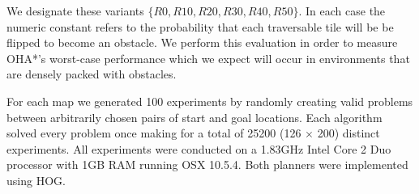 We designate these variants $\lbrace R0, R10, R20, R30, R40, R50 \rbrace$. 
In each case the numeric constant refers to the probability that each traversable tile will be be flipped to 
become an obstacle.
We perform this evaluation in order to measure OHA*'s worst-case performance which we expect will occur in 
environments that are densely packed with obstacles.
\par
For each map we generated 100 experiments by randomly creating valid problems between arbitrarily chosen 
pairs of start and goal locations.
Each algorithm solved every problem once making for a total of 25200 (126 $\times$ 200) distinct experiments.
All experiments were conducted on a 1.83GHz Intel Core 2 Duo processor with 1GB RAM running OSX 10.5.4.
Both planners were implemented using HOG. 
